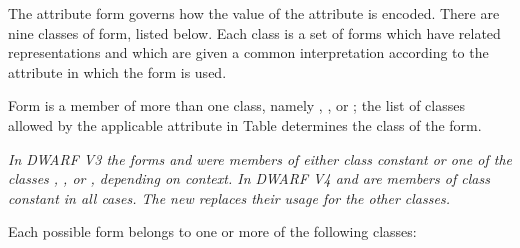 The attribute form governs how the value of the attribute is
encoded. There are nine classes of form, listed below. Each
class is a set of forms which have related representations
and which are given a common interpretation according to the
attribute in which the form is used.

Form  
is a member of more 
than 
one 
class,
namely , 
, 
 or 
; the list
of classes allowed by the applicable attribute in 
Table 
determines the class of the form.

\textit{In DWARF V3 the forms  and 
 were
members 
of 
either 
class constant 
or one of the classes 
,
, 
 or 
, depending on context. In
DWARF V4 
 and 
 are members of class
constant in all cases. 
The new 
 replaces
their usage for the other classes.}

Each possible form belongs to one or more of the following classes:

